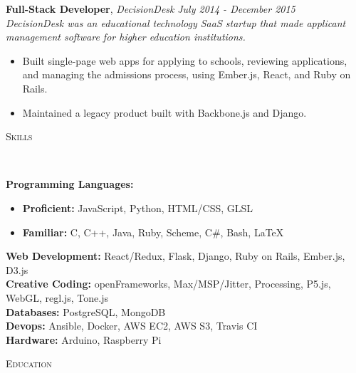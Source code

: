 \documentclass[9pt]{article}
\newenvironment{changemargin}[2]{%
  \begin{list}{}{%
    \setlength{\topsep}{0pt}%
    \setlength{\leftmargin}{#1}%
    \setlength{\rightmargin}{#2}%
    \setlength{\listparindent}{\parindent}%
    \setlength{\itemindent}{\parindent}%
    \setlength{\parsep}{\parskip}%
  }%
  \item[]}{\end{list}
}
\newcommand{\lineover}{
	\begin{changemargin}{-0.05in}{-0.05in}
		\vspace*{-8pt}
		\hrulefill \\
		\vspace*{-2pt}
	\end{changemargin}
}
\newcommand{\header}[1]{
	\begin{changemargin}{-0.5in}{-0.5in}
		\scshape{#1}\\
  	\lineover
	\end{changemargin}
}
\newenvironment{body} {
	\vspace*{-16pt}
	\begin{changemargin}{-0.25in}{-0.5in}
  }
	{\end{changemargin}
}
\begin{document}
\begin{body}
	\textbf{Full-Stack Developer}, \emph{DecisionDesk} \hfill \emph{July 2014 - December 2015}\\
	\emph{DecisionDesk was an educational technology SaaS startup that made applicant management software for higher education institutions.}
	\vspace*{-4pt}
	\begin{itemize} \itemsep -0pt  %
		\item Built single-page web apps for applying to schools, reviewing applications, and managing the admissions process, using Ember.js, React, and Ruby on Rails.
		\item Maintained a legacy product built with Backbone.js and Django.
	\end{itemize}
\end{body}
\smallskip

\header{Skills}

\begin{body}
	\vspace{14pt}
	\textbf{Programming Languages:}{}
		\begin{itemize} \itemsep -0pt  %
			\item \textbf{Proficient:} JavaScript, Python,  HTML/CSS, GLSL
			\item \textbf{Familiar:} C, C++, Java, Ruby, Scheme, C\#, Bash, \LaTeX \\
		\end{itemize}
	\smallskip
	\textbf{Web Development:}{} React/Redux, Flask, Django, Ruby on Rails, Ember.js, D3.js \\
	\smallskip
	\textbf{Creative Coding:}{} openFrameworks, Max/MSP/Jitter, Processing, P5.js, WebGL, regl.js, Tone.js \\
	\smallskip
	\textbf{Databases:}{} PostgreSQL, MongoDB \\
	\smallskip
	\textbf{Devops:}{} Ansible, Docker, AWS EC2, AWS S3, Travis CI \\
	\smallskip
	\textbf{Hardware:}{} Arduino, Raspberry Pi \\
\end{body}

\smallskip

\header{Education}
\end{document}
